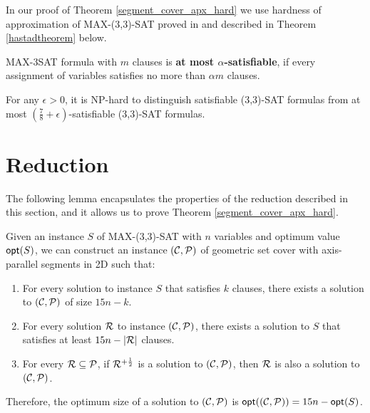 In our proof of Theorem \ref{segment_cover_apx_hard} we use
hardness of approximation of MAX-(3,3)-SAT proved
in \cite{hastad} and described in
Theorem \ref{hastadtheorem} below.

\begin{defi}
MAX-3SAT formula with $m$ clauses is \textbf{at most $\alpha$-satisfiable}, if
every assignment of variables satisfies no more than $\alpha m$
clauses. 
\end{defi}

\begin{tw}{
	\label{hastadtheorem}
	For any $\epsilon > 0$, it is NP-hard to distinguish satisfiable
	\linebreak
	(3,3)-SAT formulas from
	at most
	\mbox{$(\frac{7}{8} + \epsilon)$-satisfiable}
	(3,3)-SAT formulas.
}\end{tw}

\section{Reduction}

The following lemma encapsulates the properties
of the reduction described in this section,
and it allows us to prove Theorem \ref{segment_cover_apx_hard}.

\begin{lemma}{
	\label{apxconstruction}
	Given an instance $S$ of MAX-(3,3)-SAT 
	with $n$ variables and optimum value $\mathsf{opt}(S)$,
	we can construct an instance $(\mathcal{C}, \mathcal{P})$ of geometric set cover with
	axis-parallel segments in 2D such that:
	\begin{enumerate}[label={(\arabic*)}]
	\item \label{item:apxconstruction_correctness}
	For every solution to instance $S$ that satisfies $k$ clauses,
	there exists a solution to $(\mathcal{C}, \mathcal{P})$ of size $15n - k$.
	
	\item \label{item:apxconstruction_completness}
	For every solution $\mathcal{R}$ to instance $(\mathcal{C}, \mathcal{P})$,
	there exists a solution to $S$ that satisfies at least  $15n - |\mathcal{R}|$
	clauses.
	
	\item \label{lemma:apxconstruction:enumerate:extension}
	For every $\mathcal{R} \subseteq \mathcal{P}$, if $\mathcal{R}^{+\frac{1}{2}}$
	is a solution to $(\mathcal{C}, \mathcal{P})$, then $\mathcal{R}$
	is also a solution to $(\mathcal{C}, \mathcal{P})$.
\end{enumerate}
Therefore, the optimum size of a solution to $(\mathcal{C}, \mathcal{P})$
is $\mathsf{opt}((\mathcal{C}, \mathcal{P})) = 15n - \mathsf{opt}(S)$. 
	
}\end{lemma}

